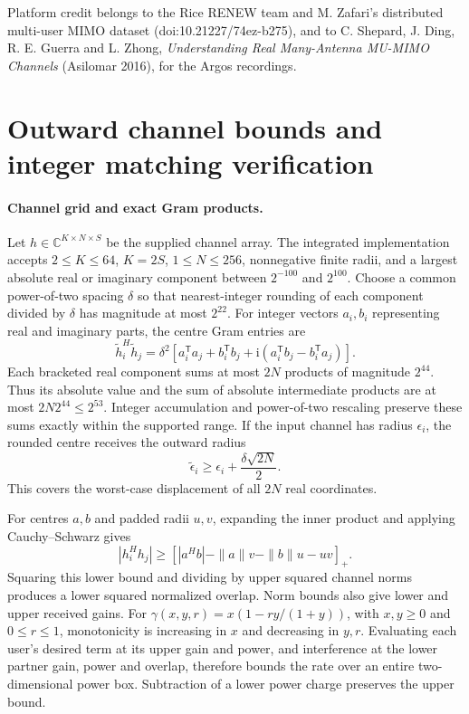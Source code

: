 \documentclass[10pt,letterpaper]{article}
\begin{document}
Platform credit belongs to the Rice RENEW team and M. Zafari's distributed
multi-user MIMO dataset (doi:10.21227/74ez-b275), and to C. Shepard,
J. Ding, R. E. Guerra and L. Zhong, \emph{Understanding Real Many-Antenna
MU-MIMO Channels} (Asilomar 2016), for the Argos recordings.

\FloatBarrier
\section{Outward channel bounds and integer matching verification}
\label{supp:note3}

\paragraph{Channel grid and exact Gram products.}
Let \(h\in\mathbb C^{K\times N\times S}\) be the supplied channel array. The integrated implementation accepts \(2\leq K\leq64\), \(K=2S\), \(1\leq N\leq256\), nonnegative finite radii, and a largest absolute real or imaginary component between \(2^{-100}\) and \(2^{100}\). Choose a common power-of-two spacing \(\delta\) so that nearest-integer rounding of each component divided by \(\delta\) has magnitude at most \(2^{22}\). For integer vectors \(a_i,b_i\) representing real and imaginary parts, the centre Gram entries are
\begin{equation}
 \widetilde h_i^H\widetilde h_j
 =\delta^2\left[
    a_i^\mathsf T a_j+b_i^\mathsf T b_j
    +\mathrm i(a_i^\mathsf T b_j-b_i^\mathsf T a_j)\right].
\end{equation}
Each bracketed real component sums at most \(2N\) products of magnitude \(2^{44}\). Thus its absolute value and the sum of absolute intermediate products are at most
\(2N2^{44}\leq2^{53}\). Integer accumulation and power-of-two rescaling preserve these sums exactly within the supported range. If the input channel has radius \(\epsilon_i\), the rounded centre receives the outward radius
\begin{equation}
 \widetilde\epsilon_i\geq\epsilon_i+\frac{\delta\sqrt{2N}}{2}.
\end{equation}
This covers the worst-case displacement of all \(2N\) real coordinates.

For centres \(a,b\) and padded radii \(u,v\), expanding the inner product and applying Cauchy--Schwarz gives
\begin{equation}
 |h_i^Hh_j|\geq
 \left[|a^Hb|-\|a\|v-\|b\|u-uv\right]_+ .
\end{equation}
Squaring this lower bound and dividing by upper squared channel norms produces a lower squared normalized overlap. Norm bounds also give lower and upper received gains. For
\(\gamma(x,y,r)=x(1-r y/(1+y))\), with \(x,y\geq0\) and \(0\leq r\leq1\), monotonicity is increasing in \(x\) and decreasing in \(y,r\). Evaluating each user's desired term at its upper gain and power, and interference at the lower partner gain, power and overlap, therefore bounds the rate over an entire two-dimensional power box. Subtraction of a lower power charge preserves the upper bound.
\end{document}

